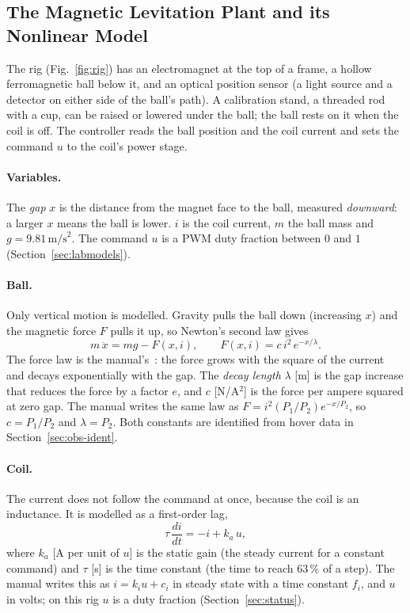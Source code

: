 \documentclass[11pt,a4paper]{article}
\begin{document}
\subsection{The Magnetic Levitation Plant and its Nonlinear Model}
\label{sec:th-model}
The rig (Fig.~\ref{fig:rig}) has an electromagnet at the top of a frame, a hollow ferromagnetic ball below it, and an
optical position sensor (a light source and a detector on either side of the ball's path). A calibration stand, a
threaded rod with a cup, can be raised or lowered under the ball; the ball rests on it when the coil is off. The
controller reads the ball position and the coil current and sets the command $u$ to the coil's power stage.

\paragraph{Variables.} The \emph{gap} $x$ is the distance from the magnet face to the ball, measured \emph{downward}:
a larger $x$ means the ball is lower. $i$ is the coil current, $m$ the ball mass and $g=9.81\,\text{m/s}^2$.
The command $u$ is a PWM duty fraction between $0$ and $1$ (Section~\ref{sec:labmodels}).

\paragraph{Ball.} Only vertical motion is modelled. Gravity pulls the ball down (increasing $x$) and the magnetic force
$F$ pulls it up, so Newton's second law gives
\begin{equation}
m\,\ddot{x} = m g - F(x,i), \qquad F(x,i) = c\, i^2\, e^{-x/\lambda}.
\label{eq:newton}
\end{equation}
The force law is the manual's~\cite{mlsmanual}: the force grows with the square of the current and decays
exponentially with the gap. The \emph{decay length} $\lambda$ [m] is the gap increase that reduces the force by a factor
$e$, and $c$ [N/A$^2$] is the force per ampere squared at zero gap. The manual writes the same law as
$F=i^2(P_1/P_2)e^{-x/P_2}$, so $c=P_1/P_2$ and $\lambda=P_2$. Both constants are identified from hover data in
Section~\ref{sec:obs-ident}.

\paragraph{Coil.} The current does not follow the command at once, because the coil is an inductance. It is
modelled as a first-order lag,
\begin{equation}
\tau\,\frac{di}{dt} = -i + k_a\,u ,
\label{eq:coil}
\end{equation}
where $k_a$ [A per unit of $u$] is the static gain (the steady current for a constant command) and $\tau$ [s] is the
time constant (the time to reach $63\,\%$ of a step). The manual writes this as $i = k_i u + c_i$ in steady state with
a time constant $f_i$, and $u$ in volts; on this rig $u$ is a duty fraction (Section~\ref{sec:status}).
\end{document}
